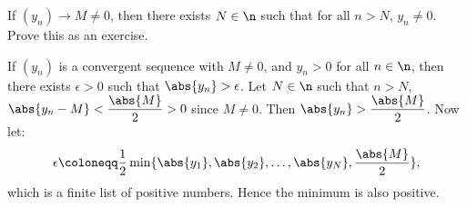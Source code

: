 \begin{proposition}{
    If $(y_n)\to M\neq 0$, then there exists $N\in\n$ such that for all $n > N$, $y_n\neq 0$.
}
    Prove this as an exercise.
\end{proposition}

\begin{proposition}{
    If $(y_n)$ is a convergent sequence with $M\neq 0$, and $y_n > 0$ for all $n\in\n$, then there exists $\epsilon > 0$ such that $\abs{y_n} > \epsilon$.
}
    Let $N\in\n$ such that $n > N$, $\abs{y_n - M} < \dfrac{\abs{M}}{2} > 0$ since $M\neq 0$.
    Then $\abs{y_n} > \dfrac{\abs{M}}{2}$.
    Now let:
    \[
        \epsilon \coloneqq \dfrac{1}{2}\min\{\abs{y_1},\abs{y_2},\ldots,\abs{y_N},\dfrac{\abs{M}}{2}\},
    \]
    which is a finite list of positive numbers.
    Hence the minimum is also positive.
\end{proposition}
